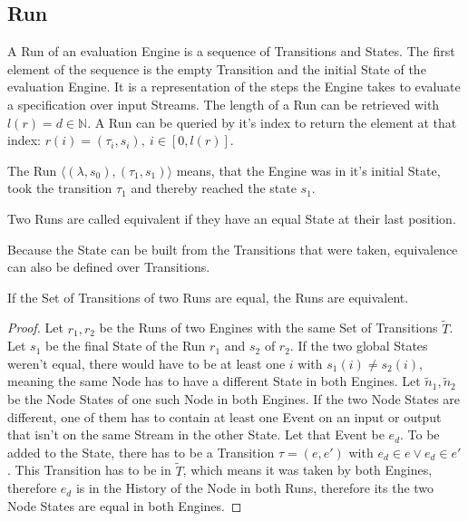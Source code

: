 \subsection{Run}
\label{sec:concepts:def:run}

A Run of an evaluation Engine is a sequence of Transitions and States.
The first element of the sequence is the empty Transition and the initial State of the evaluation Engine.
It is a representation of the steps the Engine takes to evaluate a specification over input Streams.
The length of a Run can be retrieved with \(l(r) = d \in \mathbb{N}\).
A Run can be queried by it's index to return the element at that index: \(r(i)=(\tau_i, s_i),\ i \in [0, l(r)]\).

The Run \(\langle (\lambda, s_0), (\tau_1, s_1) \rangle\) means, that the Engine was in it's initial State, took the transition \(\tau_1\) and thereby reached the state \(s_1\).

\begin{definition}[name = Equivalence of Runs]\label{def:equivalence_runs}
  Two Runs are called equivalent if they have an equal State at their last position.
\end{definition}

Because the State can be built from the Transitions that were taken, equivalence can also be defined over Transitions.

\begin{lemma}[name = Equivalence of Runs over Transitions]\label{lemma:equivalent_runs_with_transitions}
  If the Set of Transitions of two Runs are equal, the Runs are equivalent.
\end{lemma}

\begin{proof}
  Let \(r_1, r_2\) be the Runs of two Engines with the same Set of Transitions \(\widetilde{T}\).
  Let \(s_1\) be the final State of the Run \(r_1\) and \(s_2\) of \(r_2\).
  If the two global States weren't equal, there would have to be at least one \(i\) with \(s_1(i) \neq s_2(i)\), meaning the same Node has to have a different State in both Engines.
  Let \(\widetilde{n}_1, \widetilde{n}_2\) be the Node States of one such Node in both Engines.
  If the two Node States are different, one of them has to contain at least one Event on an input or output that isn't on the same Stream in the other State.
  Let that Event be \(e_d\).
  To be added to the State, there has to be a Transition \(\tau = (e, e')\) with \(e_d \in e \lor e_d \in e'\).
  This Transition has to be in \(\widetilde{T}\), which means it was taken by both Engines, therefore \(e_d\) is in the History of the Node in both Runs, therefore its the two Node States are equal in both Engines.
\end{proof}

